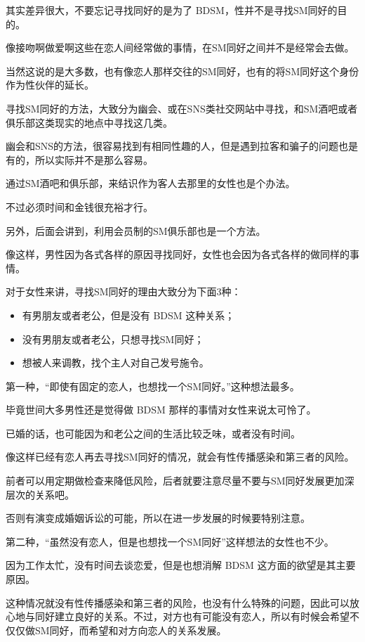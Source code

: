 \documentclass[12pt,UTF8]{ctexbook}
\begin{document}
其实差异很大，不要忘记寻找同好的是为了 BDSM，性并不是寻找SM同好的目的。

像接吻啊做爱啊这些在恋人间经常做的事情，在SM同好之间并不是经常会去做。

当然这说的是大多数，也有像恋人那样交往的SM同好，也有的将SM同好这个身份作为性伙伴的延长。

寻找SM同好的方法，大致分为幽会、或在SNS类社交网站中寻找，和SM酒吧或者俱乐部这类现实的地点中寻找这几类。

幽会和SNS的方法，很容易找到有相同性趣的人，但是遇到拉客和骗子的问题也是有的，所以实际并不是那么容易。

通过SM酒吧和俱乐部，来结识作为客人去那里的女性也是个办法。

不过必须时间和金钱很充裕才行。

另外，后面会讲到，利用会员制的SM俱乐部也是一个方法。

像这样，男性因为各式各样的原因寻找同好，女性也会因为各式各样的做同样的事情。

对于女性来讲，寻找SM同好的理由大致分为下面3种：

\begin{itemize}
\item 有男朋友或者老公，但是没有 BDSM 这种关系；
\item 没有男朋友或者老公，只想寻找SM同好；
\item 想被人来调教，找个主人对自己发号施令。
\end{itemize}

第一种，“即使有固定的恋人，也想找一个SM同好。”这种想法最多。

毕竟世间大多男性还是觉得做 BDSM 那样的事情对女性来说太可怜了。

已婚的话，也可能因为和老公之间的生活比较乏味，或者没有时间。

像这样已经有恋人再去寻找SM同好的情况，就会有性传播感染和第三者的风险。

前者可以用定期做检查来降低风险，后者就要注意尽量不要与SM同好发展更加深层次的关系吧。

否则有演变成婚姻诉讼的可能，所以在进一步发展的时候要特别注意。

第二种，“虽然没有恋人，但是也想找一个SM同好”这样想法的女性也不少。

因为工作太忙，没有时间去谈恋爱，但是也想消解 BDSM 这方面的欲望是其主要原因。

这种情况就没有性传播感染和第三者的风险，也没有什么特殊的问题，因此可以放心地与同好建立良好的关系。不过，对方也有可能没有恋人，所以有时候会希望不仅仅做SM同好，而希望和对方向恋人的关系发展。
\end{document}
